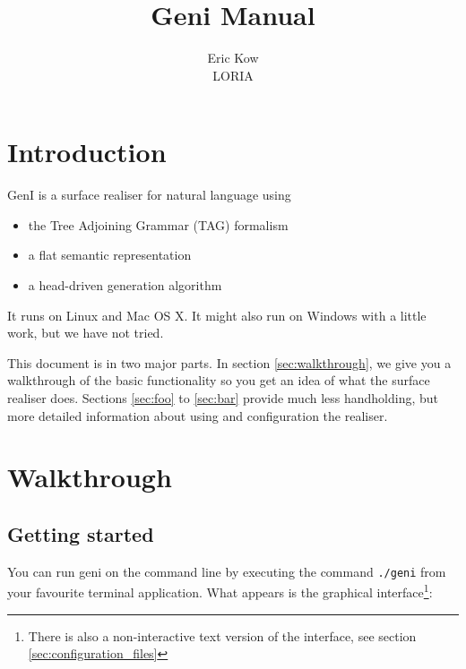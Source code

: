 \documentclass[11pt]{article}
\newcommand{\commandline}{\texttt}
\begin{document}
\title{Geni Manual}
\author{Eric Kow\\LORIA}

\maketitle

\section{Introduction}

GenI is a surface realiser for natural language using 

\begin{itemize}
\item the Tree Adjoining Grammar (TAG) formalism 
\item a flat semantic representation
\item a head-driven generation algorithm
\end{itemize}

It runs on Linux and Mac OS X.  It might also run on Windows 
with a little work, but we have not tried.  

This document is in two major parts.  In section \ref{sec:walkthrough},
we give you a walkthrough of the basic functionality so you get an idea
of what the surface realiser does.  Sections \ref{sec:foo} to
\ref{sec:bar} provide much less handholding, but more detailed
information about using and configuration the realiser.  

\section{Walkthrough}

\subsection{Getting started}

You can run geni on the command line by executing the command 
\commandline{./geni} from your favourite terminal application.
What appears is the graphical interface\footnote{There is also
a non-interactive text version of the interface, see section 
\ref{sec:configuration_files}}:
\end{document}
